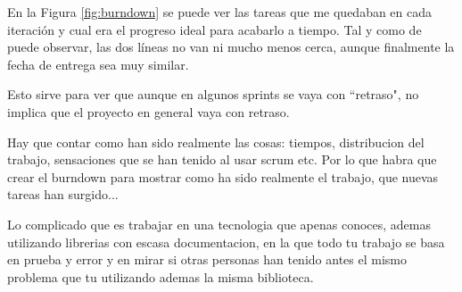 En la Figura \ref{fig:burndown} se puede ver las tareas que me quedaban en cada iteraci\'on
y cual era el progreso ideal para acabarlo a tiempo. Tal y como de puede observar,
las dos l\'ineas no van ni mucho menos cerca, aunque finalmente la fecha de entrega sea muy similar.

Esto sirve para ver que aunque en algunos sprints se vaya con ``retraso", no implica que el proyecto
en general vaya con retraso.

Hay que contar como han sido realmente las cosas: tiempos, distribucion del trabajo, 
sensaciones que se han tenido al usar scrum etc. Por lo que habra que crear el
burndown para mostrar como ha sido realmente el trabajo, que nuevas tareas han surgido...

Lo complicado que es trabajar en una tecnologia que apenas conoces, ademas utilizando
librerias con escasa documentacion, en la que todo tu trabajo se basa en prueba y error
y en mirar si otras personas han tenido antes el mismo problema que tu utilizando
ademas la misma biblioteca.